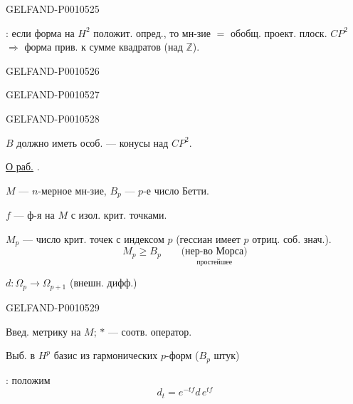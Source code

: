 \begin{GelfandAdjacentEvidence}{GELFAND-P001052}{5}


: если форма на $H^2$ положит. опред., то мн-зие $=$
обобщ. проект. плоск. $CP^2$
$\Rightarrow$ форма прив. к сумме квадратов (над $\mathbb Z$).
\end{GelfandAdjacentEvidence}
\begin{GelfandAdjacentEvidence}{GELFAND-P001052}{6}

\end{GelfandAdjacentEvidence}
\begin{GelfandAdjacentEvidence}{GELFAND-P001052}{7}

\end{GelfandAdjacentEvidence}
\begin{GelfandAdjacentEvidence}{GELFAND-P001052}{8}


$B$ должно иметь особ. — конусы над $CP^2$.

\underline{О раб.} .

$M$ — $n$-мерное мн-зие, $B_p$ — \(p\)-е число Бетти.

$f$ — ф-я на $M$ с изол. крит. точками.

$M_p$ — число крит. точек с индексом $p$ (гессиан имеет $p$ отриц. соб. знач.).
\[
M_p\geqslant B_p
\qquad\underset{\text{простейшее}}{\text{(нер-во Морса)}}
\]

$d:\Omega_p\longrightarrow\Omega_{p+1}$ (внешн. дифф.)
\end{GelfandAdjacentEvidence}
\begin{GelfandAdjacentEvidence}{GELFAND-P001052}{9}


Введ. метрику на $M$; $*$ — соотв. оператор.

Выб. в $H^p$ базис из гармонических $p$-форм ($B_p$ штук)

: положим
\[
d_t=e^{-tf}d\,e^{tf}
\]
\end{GelfandAdjacentEvidence}
